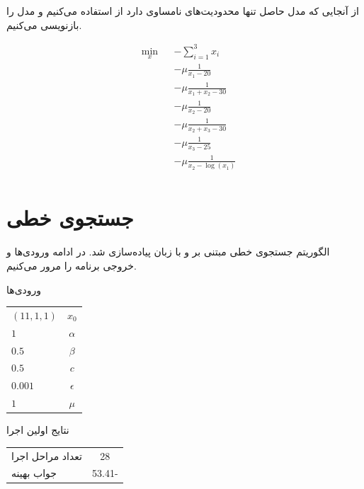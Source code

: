 \documentclass[paper=a4, fontsize=11pt]{article}
\numberwithin{equation}{section} %
\numberwithin{figure}{section} %
\numberwithin{table}{section} %
\begin{document}
\indent \par
    از آنجایی که مدل حاصل تنها محدودیت‌های نامساوی دارد از  استفاده می‌کنیم و مدل را بازنویسی می‌کنیم.

\begin{equation}
	\begin{aligned}
		& \underset{x}{\text{min}}
		& & -\sum_{i=1}^{3} x_i \\
		& & & - \mu\frac{1}{x_1 - 20} \\
		& & & - \mu\frac{1}{x_1 + x_2 - 30} \\
		& & & - \mu\frac{1}{x_2 - 20} \\
		& & & - \mu\frac{1}{x_2 + x_3 - 30} \\
		& & & - \mu\frac{1}{x_3 - 25} \\
		& & & - \mu\frac{1}{x_2 - \log(x_1)} \\
	\end{aligned}					
\end{equation}

\section{جستجوی خطی}
\indent \par
    الگوریتم جستجوی خطی مبتنی بر  و  با زبان 
	پیاده‌سازی شد.
	در ادامه ورودی‌ها و خروجی برنامه را مرور می‌کنیم.

\begin{center}
	ورودی‌ها\\
	\begin{tabular}{| l | c |}
		\hline
		$(11, 1, 1)$ & $x_0$ \\
		$1$ & $\alpha$ \\
		$0.5$ & $\beta$ \\
		$0.5$ & $c$ \\
		$0.001$ & $\epsilon$ \\
		$1$ & $\mu$ \\
		\hline
	\end{tabular}
\end{center}

\begin{center}
	نتایج اولین اجرا\\
	\begin{tabular}{| l | c |}
		\hline
		تعداد مراحل اجرا & 28 \\
		جواب بهینه & 53.41- \\
		\hline
	\end{tabular}
\end{center}
\end{document}

